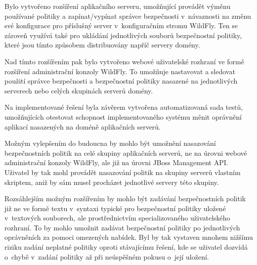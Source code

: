 Bylo vytvořeno rozšíření aplikačního serveru, umožňující provádět výměnu používané politiky a zapínat/vypínat správce bezpečnosti v~návaznosti na změnu své konfigurace pro příslušný server v~konfiguračním stromu WildFly.
Ten se zároveň využívá také pro ukládání jednotlivých souborů bezpečnostní politiky, které jsou tímto způsobem distribuovány napříč servery domény.

Nad tímto rozšířením pak bylo vytvořeno webové uživatelské rozhraní ve formě rozšíření administrační konzoly WildFly.
To umožňuje nastavovat a sledovat použití správce bezpečnosti a bezpečnostní politiky nasazené na jednotlivých serverech nebo celých skupinách serverů domény.

Na implementované řešení byla závěrem vytvořena automatizovaná sada testů, umožňujících otestovat schopnost implementovaného systému měnit oprávnění
aplikací nasazených na doméně aplikačních serverů.

Možným vylepšením do budoucna by mohlo být umožnění nasazování bezpečnostních politik na celé skupiny aplikačních serverů, ne na úrovni webové administrační konzoly WildFly, ale již na úrovni JBoss Management API. Uživatel by tak mohl provádět nasazování politik na skupiny serverů vlastním skriptem, aniž by sám musel procházet jednotlivé servery této skupiny.

Rozsáhlejším možným rozšířením by mohlo být zadávání bezpečnostních politik již ne ve formě textu v~syntaxi typické pro bezpečnostní politiky uložené v~textových souborech, ale prostřednictvím specializovaného uživatelského rozhraní.
To by mohlo umožnit zadávat bezpečnostní politiky po jednotlivých oprávněních za pomoci omezených nabídek. Byl by tak vystaven mnohem nižšímu riziku zadání neplatné politiky oproti stávajícímu řešení, kde se uživatel dozvídá o~chybě v~zadání politiky až při neúspěšném pokusu o~její uložení.

